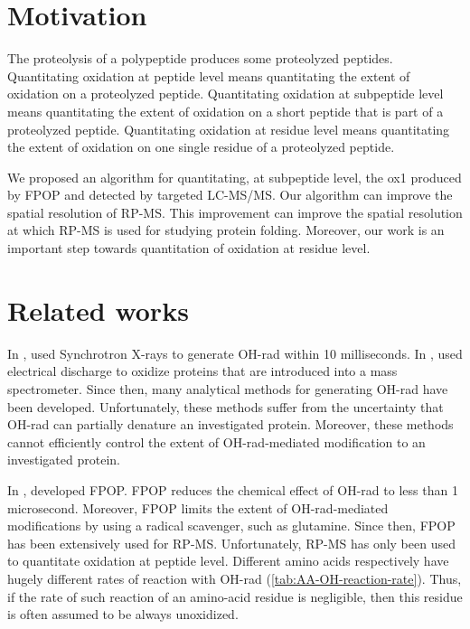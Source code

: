 \section{Motivation}
\label{sec:subpeptide-oxidation:motivation}

The proteolysis of a polypeptide produces some proteolyzed peptides.	
Quantitating oxidation at peptide level    means quantitating the extent of oxidation on a proteolyzed peptide.
Quantitating oxidation at subpeptide level means quantitating the extent of oxidation on a short peptide that is part of a proteolyzed peptide.
Quantitating oxidation at residue level    means quantitating the extent of oxidation on one single residue of a proteolyzed peptide. 
		
We proposed an algorithm for quantitating, at subpeptide level, the \gls{ox1} produced by \gls{FPOP} and detected by targeted \gls{LC-MS/MS}.
Our algorithm can improve the spatial resolution of \gls{RP-MS}.
This improvement can improve the spatial resolution at which \gls{RP-MS} is used for studying protein folding.
Moreover, our work is an important step towards quantitation of oxidation at residue level.

\section{Related works}
\label{sec:oxlvl:relatedworks}

In \citeyear{maleknia1999millisecond}, \citet{maleknia1999millisecond} used Synchrotron X-rays to generate \gls{OH-rad} within 10 milliseconds. 
In \citeyear{maleknia1999millisecond}, \citet{maleknia1999electrospray} used electrical discharge to oxidize proteins that are introduced into a mass spectrometer.
Since then, many analytical methods for generating \gls{OH-rad} have been developed.
Unfortunately, these methods suffer from the uncertainty that \gls{OH-rad} can partially denature an investigated protein.
Moreover, these methods cannot efficiently control the extent of \gls{OH-rad}-mediated modification to an investigated protein.

In \citeyear{hambly2005laser}, \citet{hambly2005laser} developed \gls{FPOP}.
\Gls{FPOP} reduces the chemical effect of \gls{OH-rad} to less than 1 microsecond.
Moreover, \gls{FPOP} limits the extent of \gls{OH-rad}-mediated modifications by using a radical scavenger, such as glutamine.
Since then, \gls{FPOP} has been extensively used for \gls{RP-MS}.
Unfortunately, \gls{RP-MS} has only been used to quantitate oxidation at peptide level.
Different amino acids respectively have hugely different rates of reaction with \gls{OH-rad} (\cref{tab:AA-OH-reaction-rate}). %
Thus, if the rate of such reaction of an amino-acid residue is negligible, then this residue is often assumed to be always unoxidized.

